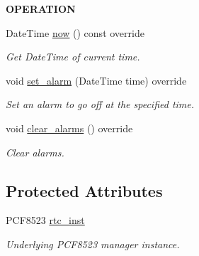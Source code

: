 \begin{Indent}{\bf O\+P\+E\+R\+A\+T\+I\+ON}\par
\begin{DoxyCompactItemize}
\item 
Date\+Time \hyperlink{class_loom___p_c_f8523_a8d39f82dea66cdb0ae2d15a1297d5490}{now} () const override
\begin{DoxyCompactList}\small\item\em Get Date\+Time of current time. \end{DoxyCompactList}\item 
void \hyperlink{class_loom___p_c_f8523_aaac2d5972d2c7745847ea6c4adc15927}{set\+\_\+alarm} (Date\+Time time) override
\begin{DoxyCompactList}\small\item\em Set an alarm to go off at the specified time. \end{DoxyCompactList}\item 
void \hyperlink{class_loom___p_c_f8523_a6b261ca485708b7fb03a01c7933940ed}{clear\+\_\+alarms} () override
\begin{DoxyCompactList}\small\item\em Clear alarms. \end{DoxyCompactList}\end{DoxyCompactItemize}
\end{Indent}
\subsection*{Protected Attributes}
\begin{DoxyCompactItemize}
\item 
P\+C\+F8523 \hyperlink{class_loom___p_c_f8523_a1eb8eaffae7033c6c2e376775e44e383}{rtc\+\_\+inst}
\begin{DoxyCompactList}\small\item\em Underlying P\+C\+F8523 manager instance. \end{DoxyCompactList}\end{DoxyCompactItemize}

